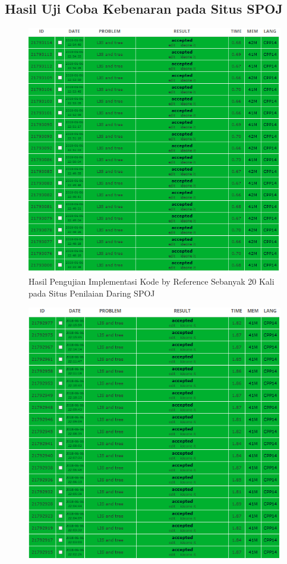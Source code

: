 \begin{appendices}

  \chapter{Hasil Uji Coba Kebenaran pada Situs SPOJ}
  \setcounter{figure}{0}
  \renewcommand{\thetable}{A.\arabic{table}}
  \renewcommand{\thefigure}{A.\arabic{figure}}
  
  \begin{figure}[H]
  	\centerline{ \includegraphics[scale=0.5]{assets/images/20accP.PNG}}
  	\caption{Hasil Pengujian Implementasi Kode by Reference Sebanyak 20 Kali pada Situs Penilaian Daring SPOJ}
  	\label{figure:point20}
  \end{figure}
    \begin{figure}[H]
    	\centerline{ \includegraphics[scale=0.5]{assets/images/20accST.PNG}}

\end{figure}
\end{appendices}
